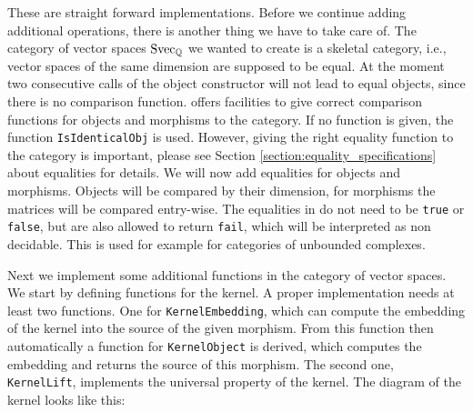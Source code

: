 These are straight forward implementations. Before we continue
adding additional operations, there is another thing we have to take care of. The category of vector spaces $\mathrm{Svec}_{\mathbb{Q}}$ we wanted
to create is a skeletal category, i.e., vector spaces of the same dimension are supposed to be equal. At the moment
two consecutive calls of the object constructor will not lead to equal objects, since there is no comparison function.
\CapPkg offers facilities to give correct comparison functions for objects and morphisms to the category. If no function
is given, the \GAP function \texttt{IsIdenticalObj} is used. However, giving the right equality function to the
category is important, please see Section \ref{section:equality_specifications} about equalities for details. We will now add equalities
for objects and morphisms. Objects will be compared by their dimension, for morphisms the matrices will be compared entry-wise.
The equalities in \CapPkg do not need to be \texttt{true} or \texttt{false}, but are also allowed to return \texttt{fail},
which will be interpreted as non decidable. This is used for example for categories of unbounded complexes.



Next we implement some additional functions in the category of vector spaces. We start by defining functions for the kernel.
A proper implementation needs at least two functions. One for \texttt{KernelEmbedding}, which can compute the embedding of the kernel
into the source of the given morphism. From this function then automatically a function for \texttt{KernelObject} is derived, which
computes the embedding and returns the source of this morphism. The second one, \texttt{KernelLift}, implements the universal property of the kernel.
The diagram of the kernel looks like this:
\begin{center}
\end{center}


